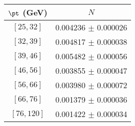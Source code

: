 \begin{tabular}{c||c}
$\pt$ (GeV) & $N$  \\
\hline
$[25, 32]$ & 0.004236 $\pm$ 0.000026\\
$[32, 39]$ & 0.004817 $\pm$ 0.000038\\
$[39, 46]$ & 0.005482 $\pm$ 0.000056\\
$[46, 56]$ & 0.003855 $\pm$ 0.000047\\
$[56, 66]$ & 0.003980 $\pm$ 0.000072\\
$[66, 76]$ & 0.001379 $\pm$ 0.000036\\
$[76, 120]$ & 0.001422 $\pm$ 0.000034\\
\end{tabular}
